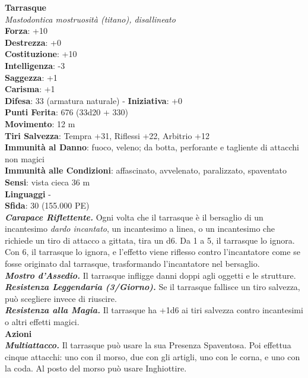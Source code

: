 \begin{multicols}{2}
\medskip\textbf{Tarrasque}\\
\emph{Mastodontica mostruosità (titano), disallineato}\\
\textbf{Forza}: +10\\
\textbf{Destrezza}: +0\\
\textbf{Costituzione}: +10\\
\textbf{Intelligenza}: -3\\
\textbf{Saggezza}: +1\\
\textbf{Carisma}: +1\\
\textbf{Difesa}: 33 (armatura naturale) - \textbf{Iniziativa}: +0\\
\textbf{Punti Ferita}: 676 (33d20 + 330)\\
\textbf{Movimento}: 12 m\\
\textbf{Tiri Salvezza}: Tempra +31, Riflessi +22, Arbitrio +12\\
\textbf{Immunità al Danno}: fuoco, veleno; da botta, perforante e tagliente di attacchi non magici\\
\textbf{Immunità alle Condizioni}: affascinato, avvelenato, paralizzato, spaventato\\
\textbf{Sensi}: vista cieca 36 m \\
\textbf{Linguaggi} -\\
\textbf{Sfida}: 30 (155.000 PE)\smallskip\\
\emph{\textbf{Carapace Riflettente.}} Ogni volta che il tarrasque è il bersaglio di un incantesimo \emph{dardo incantato}, un incantesimo a linea, o un incantesimo che richiede un tiro di attacco a gittata, tira un d6. Da 1 a 5, il tarrasque lo ignora. Con 6, il tarrasque lo ignora, e l'effetto viene riflesso contro l'incantatore come se fosse originato dal tarrasque, trasformando l'incantatore nel bersaglio. \\
\emph{\textbf{Mostro d'Assedio.}} Il tarrasque infligge danni doppi agli oggetti e le strutture.\\
\emph{\textbf{Resistenza Leggendaria (3/Giorno).}} Se il tarrasque fallisce un tiro salvezza, può scegliere invece di riuscire.\\
\emph{\textbf{Resistenza alla Magia.}} Il tarrasque ha +1d6 ai tiri salvezza contro incantesimi o altri effetti magici.\\
\smallskip\textbf{Azioni}\\
\emph{\textbf{Multiattacco.}} Il tarrasque può usare la sua Presenza Spaventosa. Poi effettua cinque attacchi: uno con il morso, due con gli artigli, uno con le corna, e uno con la coda. Al posto del morso può usare Inghiottire.\\

\end{multicols}
